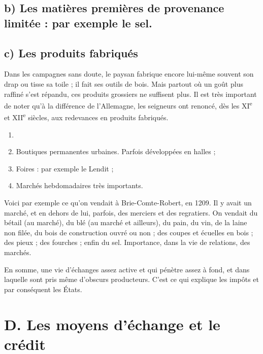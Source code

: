 \documentclass[french,twoside]{book} %
\begin{document}
\subsection[b) Les matières premières de provenance limitée : par exemple le sel.]{b) Les matières premières de provenance limitée : par exemple le sel.}
\subsection[c) Les produits fabriqués]{c) Les produits fabriqués}
\noindent Dans les campagnes sans doute, le paysan fabrique encore lui-même souvent son drap ou tisse sa toile ; il fait ses outils de bois. Mais partout où un goût plus raffiné s’est répandu, ces produits grossiers ne suffisent plus. Il est très important de noter qu’à la différence de l’Allemagne, les seigneurs ont renoncé, dès les XI\textsuperscript{e} et XII\textsuperscript{e} siècles, aux redevances en produits fabriqués.\par

\begin{enumerate}[itemsep=0pt,]
\item[] \hspace{-1.5em}{\bfseries Ce commerce intérieur se fait de trois diverses formes :}
\item Boutiques permanentes urbaines. Parfois développées en halles ;
\item Foires : par exemple le Lendit ;
\item Marchés hebdomadaires très importants.

\end{enumerate}\noindent Voici par exemple ce qu’on vendait à Brie-Comte-Robert, en 1209. Il y avait un marché, et en dehors de lui, parfois, des merciers et des regratiers. On vendait du bétail (au marché), du blé (au marché et ailleurs), du pain, du vin, de la laine non filée, du bois de construction ouvré ou non ; des coupes et écuelles en bois ; des pieux ; des fourches ; enfin du sel. Importance, dans la vie de relations, des marchés.\par
\bigbreak
\noindent En somme, une vie d’échanges assez active et qui pénètre assez à fond, et dans laquelle sont pris même d’obscurs producteurs. C’est ce qui explique les impôts et par conséquent les États.
\section[D. Les moyens d’échange et le crédit]{D. Les moyens d’échange et le crédit}
\label{c09d}
\end{document}
